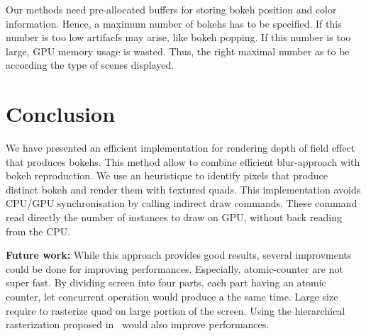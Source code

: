 Our methods need pre-allocated buffers for storing bokeh position and color information. Hence, a maximum number of bokehs has to be specified. If this number is too low artifacfs may arise, like bokeh popping. If this number is too large, GPU memory usage is wasted. Thus, the right maximal number as to be according the type of scenes displayed.

\section{Conclusion}
We have presented an efficient implementation for rendering depth of field effect that produces bokehs. This method allow to combine efficient blur-approach with bokeh reproduction. We use an heuristique to identify pixels that produce distinct bokeh and render them with textured quads. This implementation avoids CPU/GPU synchronisation by calling indirect draw commands. These command read directly the number of instances to draw on GPU, without back reading from the CPU.


\textbf{Future work:} While this approach provides good results, several improvments could be done for improving performances. Especially, atomic-counter are not super fast. By dividing screen into four parts, each part having an atomic counter, let concurrent operation would produce a the same time. Large \coc size require to rasterize quad on large portion of the screen. Using the hierarchical rasterization proposed in~\cite{Futurmark11} would also improve performances.














